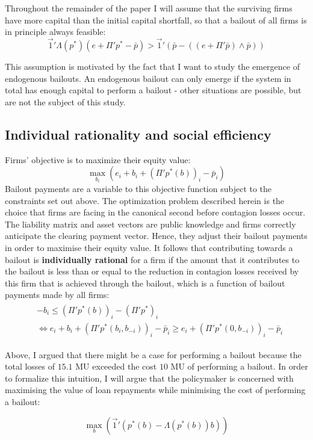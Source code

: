 \documentclass[12pt,a4paper]{article}
\begin{document}
Throughout the remainder of the paper I will assume that the surviving firms have more capital than the initial capital shortfall, so that a bailout of all firms is in principle always feasible: 
\[
\vec{1}' \Lambda (p^* )(e+\Pi'p^*-\bar{p})>\vec{1}' (\bar{p}-((e+\Pi'\bar{p})\wedge \bar{p}))
\]

This assumption is motivated by the fact that I want to study the emergence of endogenous bailouts. An endogenous bailout can only emerge if the system in total has enough capital to perform a bailout - other situations are possible, but are not the subject of this study.

\subsection{Individual rationality and social efficiency}

Firms' objective is to maximize their equity value:
\[
\max_{b_i}(e_i+b_i+(\Pi' p^* (b))_i-\bar{p}_i )
\]
Bailout payments are a variable to this objective function subject to the constraints set out above. The optimization problem described herein is the choice that firms are facing in the canonical second before contagion losses occur. The liability matrix and asset vectors are public knowledge and firms correctly anticipate the clearing payment vector. Hence, they adjust their bailout payments in order to maximise their equity value. It follows that contributing towards a bailout is \textbf{individually rational} for a firm if the amount that it contributes to the bailout is less than or equal to the reduction in contagion losses received by this firm that is achieved through the bailout, which is a function of bailout payments made by all firms: 
\begin{align*}
\begin{split}
& -b_i \le (\Pi' p^* (b))_i-(\Pi' p^* )_i \\
& \Leftrightarrow e_i+b_i+(\Pi' p^* (b_i,b_{-i} ))_i-\bar{p}_i \ge e_i+(\Pi' p^* (0,b_{-i} ))_i-\bar{p}_i
\end{split}
\end{align*}

Above, I argued that there might be a case for performing a bailout because the total losses of $15.1$ MU exceeded the cost $10$ MU of performing a bailout. In order to formalize this intuition, I will argue that the policymaker is concerned with maximising the value of loan repayments while minimising the cost of performing a bailout: 

\[
\max_{b}(\vec{1}' (p^* (b) - \Lambda (p^* (b))b))
\]
\end{document}

